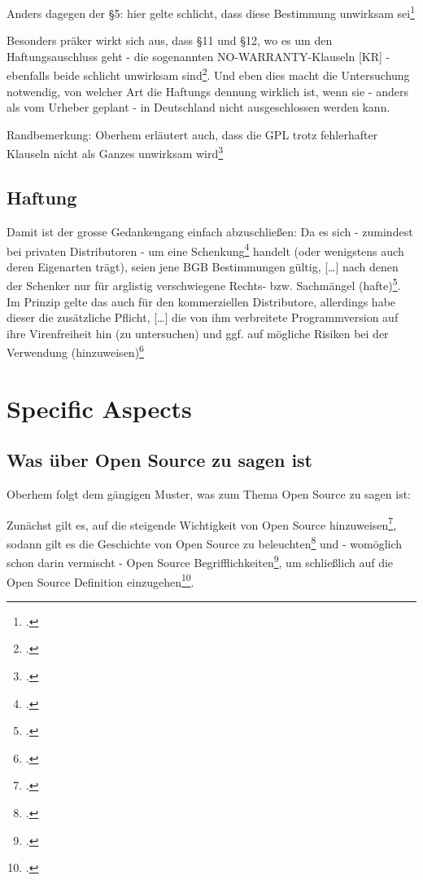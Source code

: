 \documentclass[DIV=calc,BCOR=5mm,11pt,headings=small,oneside,abstract=true, toc=bib]{scrartcl}
\begin{document}
Anders dagegen der §5: hier gelte schlicht, dass diese Bestimmung
\glqq{}unwirksam\grqq{} sei\footcite[vgl.][146]{Oberhem2008a}

Besonders präker wirkt sich aus, dass §11 und §12, wo es um den
Haftungsauschluss geht - die sogenannten NO-WARRANTY-Klauseln [KR] - ebenfalls
beide schlicht \glqq{}unwirksam sind\grqq{}\footcite[vgl.][150f]{Oberhem2008a}.
Und eben dies macht die Untersuchung notwendig, von welcher Art die Haftungs
dennung wirklich ist, wenn sie - anders als vom Urheber geplant - in Deutschland
nicht ausgeschlossen werden kann.

Randbemerkung: Oberhem erläutert auch, dass die GPL trotz fehlerhafter Klauseln
nicht als Ganzes unwirksam wird\footcite[vgl.][159]{Oberhem2008a}

\subsection{Haftung}

Damit ist der grosse Gedankengang einfach abzuschließen: Da es sich - zumindest
bei privaten Distributoren - um eine
Schenkung\footcite[vgl.][163ff]{Oberhem2008a} handelt (oder wenigstens auch
deren Eigenarten trägt), seien jene BGB Bestimmungen gültig, \glqq{}[\ldots]
nach denen der Schenker nur für arglistig verschwiegene Rechts- bzw.
Sachmängel (hafte)\grqq{}\footcite[vgl.][171]{Oberhem2008a}. Im Prinzip gelte
das auch für den kommerziellen Distributore, allerdings habe dieser die
zusätzliche Pflicht, \glqq{}[\ldots] die von ihm verbreitete
Programmversion auf ihre Virenfreiheit hin (zu untersuchen) und ggf. auf
mögliche Risiken bei der Verwendung
(hinzuweisen)\grqq{}\footcite[vgl.][211]{Oberhem2008a}


\section{Specific Aspects}

\subsection{Was über Open Source zu sagen ist}

Oberhem folgt dem gängigen Muster, was zum Thema Open Source zu sagen ist:

Zunächst gilt es, auf die steigende Wichtigkeit von Open Source
hinzuweisen\footcite[vgl.][1f]{Oberhem2008a}, sodann gilt es die Geschichte von
Open Source zu beleuchten\footcite[vgl.][17ff]{Oberhem2008a} und - womöglich
schon darin vermischt - Open Source
Begrifflichkeiten\footcite[vgl.][6ff]{Oberhem2008a}, um schließlich auf die Open
Source Definition einzugehen\footcite[vgl.][10ff]{Oberhem2008a}.
\end{document}
